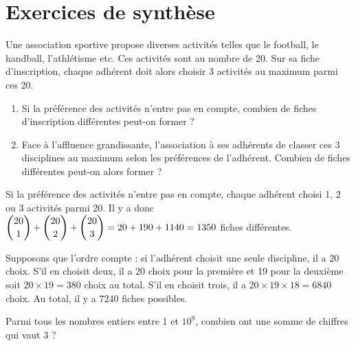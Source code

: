 \documentclass[11pt,fleqn, openany]{book} %
\begin{document}
\section*{Exercices de synthèse}



\begin{exercise}[topic=comb04]
Une association sportive propose diverses activités telles que le football, le handball, l'athlétisme etc. Ces activités sont au nombre de 20. Sur sa fiche d'inscription, chaque adhérent doit alors choisir 3 activités au maximum parmi ces 20.

\begin{enumerate}
\item Si la préférence des activités n'entre pas en compte, combien de fiches d'inscription différentes peut-on former ?
\item Face à l'affluence grandissante, l'association à ses adhérents de classer ces 3 disciplines au maximum selon les préférences de l'adhérent. Combien de fiches différentes peut-on alors former ?
\end{enumerate}\end{exercise}

\begin{solution}Si la préférence des activités n'entre pas en compte, chaque adhérent choisi 1, 2 ou 3 activités parmi 20. Il y a donc $\dbinom{20}{1}+\dbinom{20}{2}+\dbinom{20}{3}=20+190+1140=1350$ fiches différentes.

Supposons que l'ordre compte : si l'adhérent choisit une seule discipline, il a 20 choix. S'il en choisit deux, il a 20 choix pour la première et 19 pour la deuxième soit $20 \times 19 = 380$ choix au total. S'il en choisit trois, il a $20 \times 19 \times 18=6840$ choix. Au total, il y a 7240 fiches possibles.\end{solution}



\begin{exercise}[topic=comb04]Parmi tous les nombres entiers entre 1 et $10^9$, combien ont une somme de chiffres qui vaut 3 ?\end{exercise}
\end{document}
